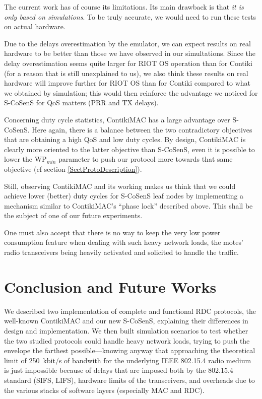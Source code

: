 \documentclass[12pt,a4paper]{article}
\begin{document}
The current work has of course its limitations. Its main drawback is that
\emph{it is only based on simulations}. To be truly accurate, we would need
to run these tests on actual hardware.

Due to the delays overestimation by the emulator, we can expect results on
real hardware to be better than those we have observed in our simultations.
Since the delay overestimation seems quite larger for RIOT OS operation
than for Contiki (for a reason that is still unexplained to us),
we also think these results on real hardware will improve further
for RIOT OS than for Contiki compared to what we obtained by simulation;
this would then reinforce the advantage we noticed for S-CoSenS for
QoS matters (PRR and TX delays).

Concerning duty cycle statistics, ContikiMAC has a large advantage over
S-CoSenS. Here again, there is a balance between the two contradictory
objectives that are obtaining a high QoS and low duty cycles. By design,
ContikiMAC is clearly more oriented to the latter objective than S-CoSenS,
even it is possible to lower the $\mathrm{WP}_{min}$ parameter to push
our protocol more towards that same objective (cf section
\ref{SectProtoDescription}).

Still, observing ContikiMAC and its working makes us think that we could
achieve lower (better) duty cycles for S-CoSenS leaf nodes by implementing
a mechanism similar to ContikiMAC's ``phase lock'' described above. This
shall be the subject of one of our future experiments.

One must also accept that there is no way to keep the very low power
consumption feature when dealing with such heavy network loads, the
motes' radio transceivers being heavily activated and solicited to
handle the traffic.



\section{Conclusion and Future Works}

We described two implementation of complete and functional RDC protocols,
the well-known ContikiMAC and our new S-CoSenS, explaining their differences
in design and implementation. We then built simulation scenarios to test
whether the two studied protocols could handle heavy network loads, trying
to push the envelope the farthest possible---knowing anyway that approaching
the theoretical limit of 250~kbit/s of bandwith for the underlying IEEE
802.15.4 radio medium is just impossible because of delays that are imposed
both by the 802.15.4 standard (SIFS, LIFS), hardware limits of the
transceivers, and overheads due to the various stacks of software
layers (especially MAC and RDC).
      
\end{document}
